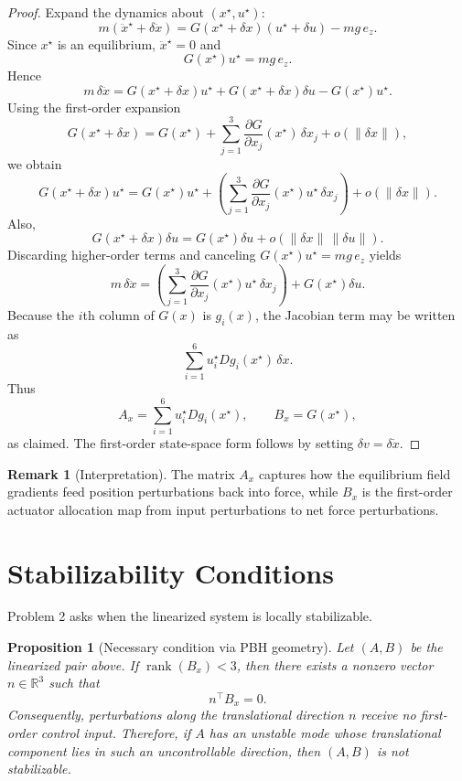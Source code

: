 \documentclass[11pt]{article}
\newtheorem{proposition}{Proposition}
\theoremstyle{definition}
\newtheorem{remark}{Remark}
\begin{document}
\begin{proof}
Expand the dynamics about $(x^\star,u^\star)$:
\[
m(\ddot x^\star+\delta \ddot x)=G(x^\star+\delta x)(u^\star+\delta u)-mg\,e_z.
\]
Since $x^\star$ is an equilibrium, $\ddot x^\star=0$ and
\[
G(x^\star)u^\star=mg\,e_z.
\]
Hence
\[
m\,\delta \ddot x = G(x^\star+\delta x)u^\star + G(x^\star+\delta x)\delta u - G(x^\star)u^\star.
\]
Using the first-order expansion
\[
G(x^\star+\delta x)=G(x^\star)+\sum_{j=1}^3 \frac{\partial G}{\partial x_j}(x^\star)\,\delta x_j + o(\|\delta x\|),
\]
we obtain
\[
G(x^\star+\delta x)u^\star
=
G(x^\star)u^\star
+
\left(\sum_{j=1}^3 \frac{\partial G}{\partial x_j}(x^\star)u^\star\,\delta x_j\right)
+o(\|\delta x\|).
\]
Also,
\[
G(x^\star+\delta x)\delta u = G(x^\star)\delta u + o(\|\delta x\|\,\|\delta u\|).
\]
Discarding higher-order terms and canceling $G(x^\star)u^\star=mg\,e_z$ yields
\[
m\,\delta \ddot x =
\left(\sum_{j=1}^3 \frac{\partial G}{\partial x_j}(x^\star)u^\star\,\delta x_j\right)
+
G(x^\star)\delta u.
\]
Because the $i$th column of $G(x)$ is $g_i(x)$, the Jacobian term may be written as
\[
\sum_{i=1}^6 u_i^\star Dg_i(x^\star)\,\delta x.
\]
Thus
\[
A_x=\sum_{i=1}^6 u_i^\star Dg_i(x^\star),
\qquad
B_x=G(x^\star),
\]
as claimed. The first-order state-space form follows by setting $\delta v=\delta \dot x$.
\end{proof}

\begin{remark}[Interpretation]
The matrix $A_x$ captures how the equilibrium field gradients feed position perturbations back into force, while $B_x$ is the first-order actuator allocation map from input perturbations to net force perturbations.
\end{remark}

\section{Stabilizability Conditions}

Problem 2 asks when the linearized system is locally stabilizable.

\begin{proposition}[Necessary condition via PBH geometry]
Let $(A,B)$ be the linearized pair above. If $\operatorname{rank}(B_x)<3$, then there exists a nonzero vector $n\in\mathbb{R}^3$ such that
\[
n^\top B_x=0.
\]
Consequently, perturbations along the translational direction $n$ receive no first-order control input. Therefore, if $A$ has an unstable mode whose translational component lies in such an uncontrollable direction, then $(A,B)$ is not stabilizable.
\end{proposition}
\end{document}
